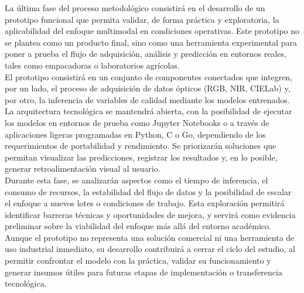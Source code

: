 La última fase del proceso metodológico consistirá en el desarrollo de un prototipo funcional que permita validar, de forma práctica y exploratoria, la aplicabilidad del enfoque multimodal en condiciones operativas. Este prototipo no se plantea como un producto final, sino como una herramienta experimental para poner a prueba el flujo de adquisición, análisis y predicción en entornos reales, tales como empacadoras o laboratorios agrícolas.\\

El prototipo consistirá en un conjunto de componentes conectados que integren, por un lado, el proceso de adquisición de datos ópticos (RGB, NIR, CIELab) y, por otro, la inferencia de variables de calidad mediante los modelos entrenados. La arquitectura tecnológica se mantendrá abierta, con la posibilidad de ejecutar los modelos en entornos de prueba como Jupyter Notebooks o a través de aplicaciones ligeras programadas en Python, C o Go, dependiendo de los requerimientos de portabilidad y rendimiento. Se priorizarán soluciones que permitan visualizar las predicciones, registrar los resultados y, en lo posible, generar retroalimentación visual al usuario.\\

Durante esta fase, se analizarán aspectos como el tiempo de inferencia, el consumo de recursos, la estabilidad del flujo de datos y la posibilidad de escalar el enfoque a nuevos lotes o condiciones de trabajo. Esta exploración permitirá identificar barreras técnicas y oportunidades de mejora, y servirá como evidencia preliminar sobre la viabilidad del enfoque más allá del entorno académico.\\

Aunque el prototipo no representa una solución comercial ni una herramienta de uso industrial inmediato, su desarrollo contribuirá a cerrar el ciclo del estudio, al permitir confrontar el modelo con la práctica, validar su funcionamiento y generar insumos útiles para futuras etapas de implementación o transferencia tecnológica.